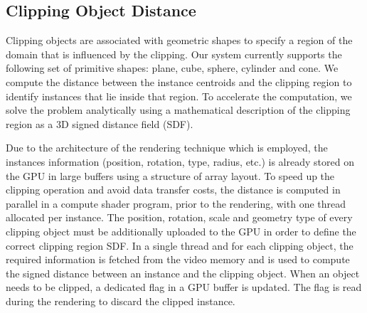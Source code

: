 \subsection{Clipping Object Distance}
\label{localization}
Clipping objects are associated with geometric shapes to specify a region of the domain that is influenced by the clipping.
Our system currently supports the following set of primitive shapes: plane, cube, sphere, cylinder and cone.
We compute the distance between the instance centroids and the clipping region to identify instances that lie inside that region.
To accelerate the computation, we solve the problem analytically using a mathematical description of the clipping region as a 3D signed distance field (SDF).

Due to the architecture of the rendering technique which is employed, the instances information (position, rotation, type, radius, etc.) is already stored on the GPU in large buffers using a structure of array layout.
To speed up the clipping operation and avoid data transfer costs, the distance is computed in parallel in a compute shader program, prior to the rendering, with one thread allocated per instance.  
The position, rotation, scale and geometry type of every clipping object must be additionally uploaded to the GPU in order to define the correct clipping region SDF.
In a single thread and for each clipping object, the required information is fetched from the video memory and is used to compute the signed distance between an instance and the clipping object.
When an object needs to be clipped, a dedicated flag in a GPU buffer is updated. The flag is read during the rendering to discard the clipped instance.

